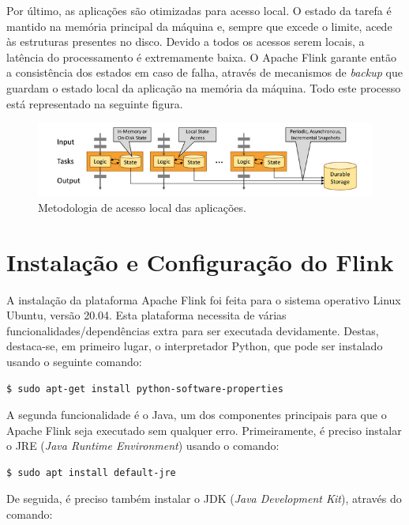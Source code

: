 \documentclass[conference]{IEEEtran}
\begin{document}
Por último, as aplicações são otimizadas para acesso local. O estado da tarefa é mantido na memória principal da máquina e, sempre que excede o limite, acede às estruturas presentes no disco. Devido a todos os acessos serem locais, a latência do processamento é extremamente baixa. O Apache Flink garante então a consistência dos estados em caso de falha, através de mecanismos de \emph{backup} que guardam o estado local da aplicação na memória da máquina. Todo este processo está representado na seguinte figura.

\begin{figure}[!htbp]
\centering
\includegraphics[scale= 0.5]{memory.png}
\caption{Metodologia de acesso local das aplicações.}
\label{memory}
\end{figure}

\section{Instalação e Configuração do Flink}
\label{instalacao}

A instalação da plataforma Apache Flink foi feita para o sistema operativo Linux Ubuntu, versão 20.04. Esta plataforma necessita de várias funcionalidades/dependências extra para ser executada devidamente. Destas, destaca-se, em primeiro lugar, o interpretador Python, que pode ser instalado usando o seguinte comando:

\begin{lstlisting}[language=bash]
  $ sudo apt-get install python-software-properties 
\end{lstlisting}

A segunda funcionalidade é o Java, um dos componentes principais para que o Apache Flink seja executado sem qualquer erro. Primeiramente, é preciso instalar o JRE (\emph{Java Runtime Environment}) usando o comando:

\begin{lstlisting}[language=bash]
  $ sudo apt install default-jre
\end{lstlisting}

De seguida, é preciso também instalar o JDK (\emph{Java Development Kit}), através do comando:
\end{document}
